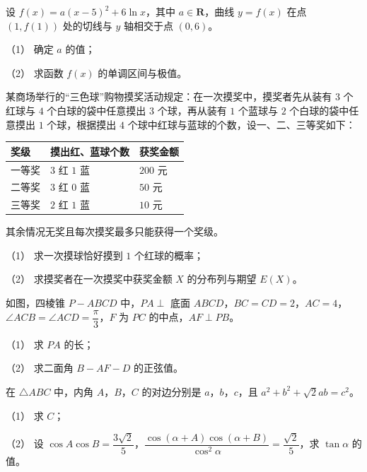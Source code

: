 \begin{question}
设 $f(x)=a(x-5)^2+6\ln x$，其中 $a\in\mathbf R$，曲线 $y=f(x)$ 在点 $(1,f(1))$ 处的切线与 $y$ 轴相交于点 $(0,6)$。

（1） 确定 $a$ 的值；

（2） 求函数 $f(x)$ 的单调区间与极值。

\end{question}
\begin{question}
某商场举行的“三色球”购物摸奖活动规定：在一次摸奖中，摸奖者先从装有 $3$ 个红球与 $4$ 个白球的袋中任意摸出 $3$ 个球，再从装有 $1$ 个蓝球与 $2$ 个白球的袋中任意摸出 $1$ 个球，根据摸出 $4$ 个球中红球与蓝球的个数，设一、二、三等奖如下：

\begin{center}
\begin{tabular}{lll}
\toprule
奖级 & 摸出红、蓝球个数 & 获奖金额 \\
\midrule
一等奖 & $3$ 红 $1$ 蓝 & $200$ 元 \\
二等奖 & $3$ 红 $0$ 蓝 & $50$ 元 \\
三等奖 & $2$ 红 $1$ 蓝 & $10$ 元 \\
\bottomrule
\end{tabular}
\end{center}

其余情况无奖且每次摸奖最多只能获得一个奖级。

（1） 求一次摸球恰好摸到 $1$ 个红球的概率；

（2） 求摸奖者在一次摸奖中获奖金额 $X$ 的分布列与期望 $E(X)$。

\Needspace{0.4\textheight}
\end{question}
\begin{question}
如图，四棱锥 $P-ABCD$ 中，$PA\perp$ 底面 $ABCD$，$BC=CD=2$，$AC=4$，$\angle ACB=\angle ACD=\dfrac\pi3$，$F$ 为 $PC$ 的中点，$AF\perp PB$。

（1） 求 $PA$ 的长；

（2） 求二面角 $B-AF-D$ 的正弦值。
\nopagebreak[4]
\begin{center}\end{center}
\nopagebreak[4]
\end{question}
\begin{question}
在 $\triangle ABC$ 中，内角 $A$，$B$，$C$ 的对边分别是 $a$，$b$，$c$，且 $a^2+b^2+\sqrt2ab=c^2$。

（1） 求 $C$；

（2） 设 $\cos A\cos B=\dfrac{3\sqrt2}5$，$\dfrac{\cos(\alpha+A)\cos(\alpha+B)}{\cos^2\alpha}=\dfrac{\sqrt2}5$，求 $\tan\alpha$ 的值。

\Needspace{0.4\textheight}
\end{question}
